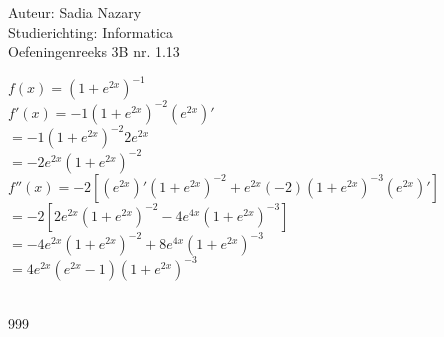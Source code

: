 \documentclass[a4paper]{article}
\begin{document}
  
\noindent \large Auteur: Sadia Nazary  \\
\noindent \large Studierichting: Informatica\\
\noindent \large Oefeningenreeks 3B nr. 1.13\\

\medskip

\normalsize

$f(x)=(1+e^{2x})^{-1}$ \\

$f'(x)=-1(1+e^{2x})^{-2}(e^{2x})'$ \\

$=-1(1+e^{2x})^{-2}2e^{2x}$ \\

$=-2e^{2x}(1+e^{2x})^{-2}$ \\

$f''(x)=-2\left[(e^{2x})'(1+e^{2x})^{-2}+e^{2x}(-2)(1+e^{2x})^{-3}(e^{2x})'\right]$ \\

$=-2\left[2e^{2x}(1+e^{2x})^{-2}-4e^{4x}(1+e^{2x})^{-3}\right]$ \\

$=-4e^{2x}(1+e^{2x})^{-2}+8e^{4x}(1+e^{2x})^{-3}$ \\

$=4e^{2x}(e^{2x}-1)(1+e^{2x})^{-3}$ \\

 \\

\begin{thebibliography}{999}
\end{thebibliography}
\end{document}
